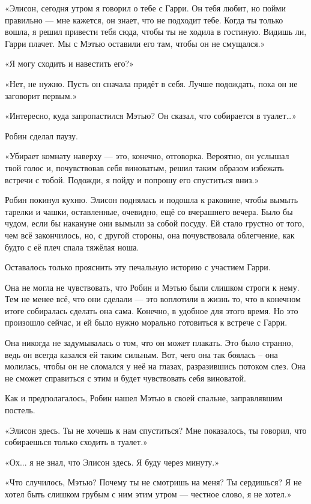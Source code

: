 \documentclass[a5paper, 9pt,
final, openany, twoside=true]{memoir}
\begin{document}
«Элисон, сегодня утром я говорил о тебе с Гарри. Он тебя любит, но пойми правильно — мне кажется, он знает, что не подходит тебе. Когда ты только вошла, я решил привести тебя сюда, чтобы ты не ходила в гостиную. Видишь ли, Гарри плачет. Мы с Мэтью оставили его там, чтобы он не смущался.»

«Я могу сходить и навестить его?»

«Нет, не нужно. Пусть он сначала придёт в себя. Лучше подождать, пока он не заговорит первым.»

«Интересно, куда запропастился Мэтью? Он сказал, что собирается в туалет…»

Робин сделал паузу.

«Убирает комнату наверху — это, конечно, отговорка. Вероятно, он услышал твой голос и, почувствовав себя виноватым, решил таким образом избежать встречи с тобой. Подожди, я пойду и попрошу его спуститься вниз.»

Робин покинул кухню. Элисон поднялась и подошла к раковине, чтобы вымыть тарелки и чашки, оставленные, очевидно, ещё со вчерашнего вечера. Было бы чудом, если бы накануне они вымыли за собой посуду. Ей стало грустно от того, чем всё закончилось, но, с другой стороны, она почувствовала облегчение, как будто с её плеч спала тяжёлая ноша.

Оставалось только прояснить эту печальную историю с участием Гарри.

Она не могла не чувствовать, что Робин и Мэтью были слишком строги к нему. Тем не менее всё, что они сделали — это воплотили в жизнь то, что в конечном итоге собиралась сделать она сама. Конечно, в удобное для этого время. Но это произошло сейчас, и ей было нужно морально готовиться к встрече с Гарри.

Она никогда не задумывалась о том, что он может плакать. Это было странно, ведь он всегда казался ей таким сильным. Вот, чего она так боялась – она молилась, чтобы он не сломался у неё на глазах,  разразившись потоком слез. Она не сможет справиться с этим и будет чувствовать себя виноватой.

Как и предполагалось, Робин нашел Мэтью в своей спальне, заправлявшим постель.

«Элисон здесь. Ты не хочешь к нам спуститься? Мне показалось, ты говорил, что собираешься только сходить в туалет.»

«Ох... я не знал, что Элисон здесь. Я буду через минуту.»

«Что случилось, Мэтью? Почему ты не смотришь на меня? Ты сердишься? Я не хотел быть слишком грубым с ним этим утром — честное слово, я не хотел.»
\end{document}
